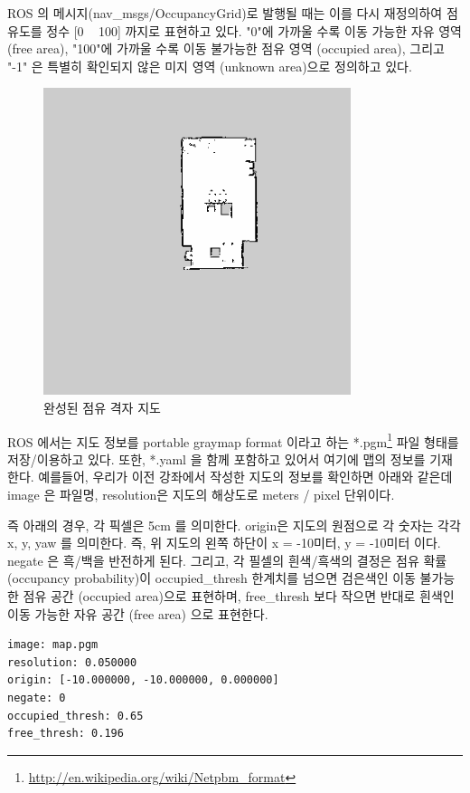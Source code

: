 ROS 의 메시지(nav\_msgs/OccupancyGrid)로 발행될 때는 이를 다시 재정의하여 점유도를 정수 [0 ~ 100] 까지로 표현하고 있다. "0"에 가까울 수록 이동 가능한 자유 영역 (free area), "100"에 가까울 수록 이동 불가능한 점유 영역 (occupied area), 그리고 "-1" 은 특별히 확인되지 않은 미지 영역 (unknown area)으로 정의하고 있다.

\begin{figure}[h]
\centering
\includegraphics[width=0.5\columnwidth]{pictures/chapter11/slam_map.png}
\caption{완성된 점유 격자 지도}
\end{figure}


ROS 에서는 지도 정보를 portable graymap format 이라고 하는 *.pgm\footnote{\url{http://en.wikipedia.org/wiki/Netpbm_format}} 파일 형태를 저장/이용하고 있다. 또한, *.yaml 을 함께 포함하고 있어서 여기에 맵의 정보를 기재한다. 예를들어, 우리가 이전 강좌에서 작성한 지도의 정보를 확인하면 아래와 같은데 image 은 파일명, resolution은 지도의 해상도로 meters / pixel 단위이다.

즉 아래의 경우, 각 픽셀은 5cm 를 의미한다. origin은 지도의 원점으로 각 숫자는 각각 x, y, yaw 를 의미한다. 즉, 위 지도의 왼쪽 하단이 x = -10미터, y = -10미터 이다. negate 은 흑/백을 반전하게 된다. 그리고, 각 필셀의 흰색/흑색의 결정은 점유 확률(occupancy probability)이 occupied\_thresh 한계치를 넘으면 검은색인 이동 불가능한 점유 공간 (occupied area)으로 표현하며, free\_thresh 보다 작으면 반대로 흰색인 이동 가능한 자유 공간 (free area) 으로 표현한다.

\vspace{\baselineskip}
\begin{lstlisting}[language=ROS]
image: map.pgm
resolution: 0.050000
origin: [-10.000000, -10.000000, 0.000000]
negate: 0
occupied_thresh: 0.65
free_thresh: 0.196
\end{lstlisting}


